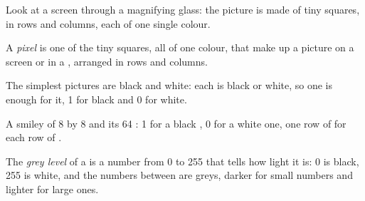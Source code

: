 Look at a screen through a magnifying glass: the picture is made of tiny
squares, in rows and columns, each of one single colour.

\begin{definition}[Pixel]\label{def:g5:text-pictures-sound-as-numbers:pixel}
A \emph{pixel} is one of the tiny squares, all of one colour,
that make up a picture on a screen or in a , arranged in rows and columns.
\end{definition}

The simplest pictures are black and white: each  is black or white, so
one  is enough for it, 1 for black and 0 for white.

\begin{omfigure}

{\small A smiley of 8 by 8  and its 64 : 1 for a black , 0 for
a white one, one row of  for each row of .}
\label{fig:g5:text-pictures-sound-as-numbers:smiley}
\end{omfigure}

\begin{definition}\label{def:g5:text-pictures-sound-as-numbers:grey}
The \emph{grey level} of a  is a number from 0 to 255
that tells how light it is: 0 is black, 255 is white, and the numbers between
are greys, darker for small numbers and lighter for large ones.
\end{definition}


